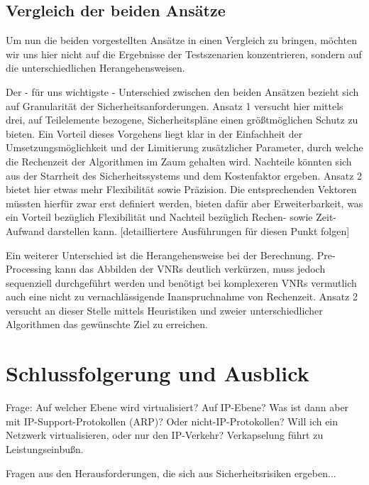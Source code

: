 \documentclass{lni}
\begin{document}
\subsection{Vergleich der beiden Ansätze}
\label{subsec:svne_vergleich}

Um nun die beiden vorgestellten Ansätze in einen Vergleich zu bringen, möchten wir uns hier nicht auf die Ergebnisse der Testszenarien konzentrieren, sondern auf die unterschiedlichen Herangehensweisen.

Der - für uns wichtigste - Unterschied zwischen den beiden Ansätzen bezieht sich auf Granularität der Sicherheitsanforderungen. Ansatz 1 versucht hier mittels drei, auf Teilelemente bezogene, Sicherheitspläne einen größtmöglichen Schutz zu bieten. Ein Vorteil dieses Vorgehens liegt klar in der Einfachheit der Umsetzungsmöglichkeit und der Limitierung zusätzlicher Parameter, durch welche die Rechenzeit der Algorithmen im Zaum gehalten wird. Nachteile könnten sich aus der Starrheit des Sicherheitssystems und dem Kostenfaktor ergeben. Ansatz 2 bietet hier etwas mehr Flexibilität sowie Präzision. Die entsprechenden Vektoren müssten hierfür zwar erst definiert werden, bieten dafür aber Erweiterbarkeit, was ein Vorteil bezüglich Flexibilität und Nachteil bezüglich Rechen- sowie Zeit-Aufwand darstellen kann. [detailliertere Ausführungen für diesen Punkt folgen]

Ein weiterer Unterschied ist die Herangehensweise bei der Berechnung. Pre-Processing kann das Abbilden der VNRs deutlich verkürzen, muss jedoch sequenziell durchgeführt werden und benötigt bei komplexeren VNRs vermutlich auch eine nicht zu vernachlässigende Inanspruchnahme von Rechenzeit. Ansatz 2 versucht an dieser Stelle mittels Heuristiken und zweier unterschiedlicher Algorithmen das gewünschte Ziel zu erreichen.


\section{Schlussfolgerung und Ausblick}
\label{sec:schluss}
Frage: Auf welcher Ebene wird virtualisiert? Auf IP-Ebene? Was ist dann aber mit IP-Support-Protokollen (ARP)? Oder nicht-IP-Protokollen? Will ich ein Netzwerk virtualisieren, oder nur den IP-Verkehr? Verkapselung führt zu Leistungseinbußn. \cite{cabuk2007towards}

Fragen aus den Herausforderungen, die sich aus Sicherheitsrisiken ergeben...



{}
\end{document}
